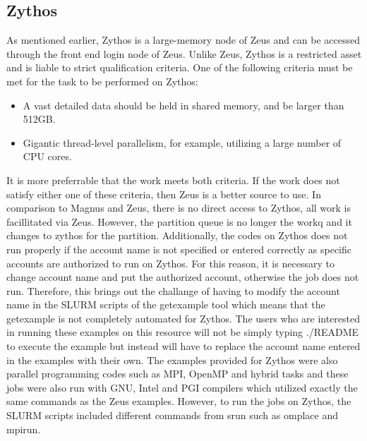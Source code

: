 \subsection{Zythos}
As mentioned earlier, Zythos is a large-memory node of Zeus and can be accessed through the front end login node of Zeus. Unlike Zeus, Zythos is a 
restricted asset and is liable to strict qualification criteria. One of the following criteria must be met for the task to be performed on Zythos:

\begin{itemize}
\item A vast detailed data should be held in shared memory, and be larger than 512GB.
\item Gigantic thread-level parallelism, for example, utilizing a large number of CPU cores.
\end{itemize}

It is more preferrable that the work meets both criteria. If the work does not satisfy either one of these criteria, then Zeus is a better source to
use. In comparison to  Magnus and Zeus, there is no direct access to Zythos, all work is facillitated via Zeus. However, the partition queue is no longer
the workq and it changes to zythos for the partition. Additionally, the codes on Zythos does not run properly if the account name is not specified or 
entered correctly as specific accounts are authorized to run on Zythos. For this reason, it is necessary to change account name and put the authorized 
account, otherwise the job does not run. Therefore, this brings out the challange of having to modify the account name in the SLURM scripts of the 
getexample tool which means that the getexample is not completely automated for Zythos. The users who are interested in running these examples on this 
resource will not be simply typing ./README to execute the example but instead will have to replace the account name entered in the examples with their 
own. The examples provided for Zythos were also parallel programming codes such as MPI, OpenMP and hybrid tasks and these jobs were also run with GNU, 
Intel and PGI compilers which utilized exactly the same commands as the Zeus examples. However, to run the jobs on Zythos, the SLURM scripts included
different commands from srun such as omplace and mpirun. 

